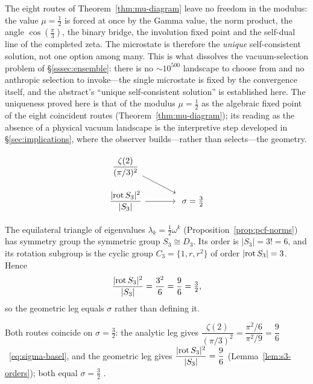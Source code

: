 \begin{remark}\label{rmk:no-landscape}
The eight routes of Theorem~\ref{thm:mu-diagram} leave no freedom in the modulus: the value $\mu=\tfrac12$ is
forced at once by the Gamma value, the norm product, the angle $\cos(\tfrac{\pi}{3})$, the binary bridge, the
involution fixed point and the self-dual line of the completed zeta. The microstate is therefore the \emph{unique} self-consistent solution, not one option
among many. This is what dissolves the vacuum-selection problem of \S\ref{sssec:ensemble}: there is no
$\sim 10^{500}$ landscape to choose from and no anthropic selection to invoke---the single microstate is fixed by
the convergence itself, and the abstract's ``unique self-consistent solution'' is established here. The uniqueness proved here is that of the modulus $\mu=\tfrac12$ as the algebraic fixed point of the eight coincident routes (Theorem~\ref{thm:mu-diagram}); its reading as the absence of a physical vacuum landscape is the interpretive step developed in \S\ref{sec:implications}, where the observer builds---rather than selects---the geometry.
\end{remark}

\[
\begin{tikzcd}[row sep=small, column sep=large]
\dfrac{\zeta(2)}{(\pi/3)^2} \arrow[dr] & \\
\dfrac{|{\rm rot}\,S_3|^2}{|S_3|} \arrow[r] & \ \sigma=\tfrac32
\end{tikzcd}
\]

\begin{lemma}\label{lem:s3-orders}
The equilateral triangle of eigenvalues $\lambda_k=\tfrac12\omega^{k}$
(Proposition~\ref{prop:pcf-norms}) has symmetry group the symmetric group
$S_3\cong D_3$. Its order is $|S_3|=3!=6$, and its rotation subgroup is the
cyclic group $C_3=\{1,r,r^2\}$ of order $|{\rm rot}\,S_3|=3$. Hence
\begin{equation}\label{eq:sigma-geom}
\frac{|{\rm rot}\,S_3|^2}{|S_3|}=\frac{3^2}{6}=\frac{9}{6}=\tfrac32 ,
\end{equation}
so the geometric leg equals $\sigma$ rather than defining it.

\end{lemma}

\begin{theorem}\label{thm:sigma-diagram}
Both routes coincide on $\sigma=\tfrac32$: the analytic leg gives
$\dfrac{\zeta(2)}{(\pi/3)^2}=\dfrac{\pi^2/6}{\pi^2/9}=\dfrac{9}{6}$~\eqref{eq:sigma-basel}, and the
geometric leg gives $\dfrac{|{\rm rot}\,S_3|^2}{|S_3|}=\dfrac{9}{6}$
(Lemma~\ref{lem:s3-orders}); both equal $\sigma=\tfrac32$ .
\end{theorem}

